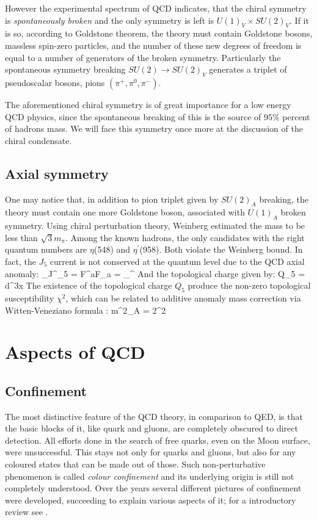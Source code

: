 \vspace{-0.5cm}
However the experimental spectrum of QCD indicates, that the chiral symmetry is \textit{spontaneously broken} and the only symmetry is left is $U(1)_V \times SU(2)_V$. If it is so, according to Goldstone theorem, the theory must contain Goldstone bosons, massless spin-zero particles, and the number of these new degrees of freedom is equal to a number of generators of the broken symmetry. Particularly the spontaneous symmetry breaking $SU(2) \rightarrow SU(2)_V$ generates a triplet of pseudoscalar bosons, pions $(\pi^+, \pi^0, \pi^-)$. 
	
	The aforementioned chiral symmetry is of great importance for a low energy QCD physics, since the spontaneous breaking of this is the source of $95\%$ percent of hadrons mass. We will face this symmetry once more at the discussion of the chiral condensate.
	\subsection*{Axial symmetry}
	One may notice that, in addition to pion triplet given by $SU(2)_A$ breaking, the theory must contain one more Goldstone boson, associated with $U(1)_A$ broken symmetry. Using chiral perturbation theory, Weinberg \cite{PhysRevD.11.3583} estimated
the mass to be less than $\sqrt{3}m_\pi$. Among the known hadrons, the only candidates with the right quantum numbers are $\eta$(548) and $\eta^{\prime}$(958). Both violate the Weinberg bound. In fact, the $J_5$ current is not conserved at the quantum level due to the QCD axial anomaly:
\beqa
	\partial_\mu J^\mu_5 = F^{a\mu\nu}F_{a\mu\nu} = \partial_\mu \raisebox{2pt}{$\chi$}^\mu
\eeqa
And the topological charge given by:
\beqa
	Q_5 = \int d^3x  
\eeqa
The existence of the topological charge $Q_5$ produce the non-zero topological susceptibility $\chi^2$, which can be related to additive anomaly mass correction via Witten-Veneziano formula \cite{Witten1979269,Veneziano1979213}:
\beqa
	m^2_A = 2\chi^2
\eeqa


\section{Aspects of QCD}
	\subsection*{Confinement}
The most distinctive feature of the QCD theory, in comparison to QED, is that the basic blocks of it, like quark and gluons, are completely obscured to direct detection. All efforts done in the search of free quarks, even on the Moon surface, were unsuccessful. This stays not only for quarks and gluons, but also for any coloured states that can be made out of those. Such non-perturbative phenomenon is called \textit{colour confinement} and its  underlying origin is still not completely understood. Over the years several different pictures of confinement were developed, succeeding to explain various aspects of it; for a introductory review see \cite{Greensite201101}. 

